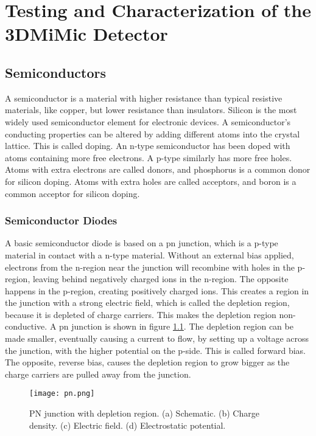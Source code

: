 \documentclass[../main/thesis.tex]{subfiles}
\begin{document}
\newpage
\chapter{Testing and Characterization of the 3DMiMic Detector}
\label{3dmimic}

\section{Semiconductors}
\label{t-semi}

A semiconductor is a material with higher resistance than typical resistive materials, like copper, but lower resistance than insulators. Silicon is the most widely used semiconductor element for electronic devices. A semiconductor's conducting properties can be altered by adding different atoms into the crystal lattice. This is called doping. An n-type semiconductor has been doped with atoms containing more free electrons. A p-type similarly has more free holes. Atoms with extra electrons are called donors, and phosphorus is a common donor for silicon doping. Atoms with extra holes are called acceptors, and boron is a common acceptor for silicon doping. 

\subsection{Semiconductor Diodes}

A basic semiconductor diode is based on a pn junction, which is a p-type material in contact with a n-type material. Without an external bias applied, electrons from the n-region near the junction will recombine with holes in the p-region, leaving behind negatively charged ions in the n-region. The opposite happens in the p-region, creating positively charged ions. This creates a region in the junction with a strong electric field, which is called the depletion region, because it is depleted of charge carriers. This makes the depletion region non-conductive. A pn junction is shown in figure \ref{fig-pn}. The depletion region can be made smaller, eventually causing a current to flow, by setting up a voltage across the junction, with the higher potential on the p-side. This is called forward bias. The opposite, reverse bias, causes the depletion region to grow bigger as the charge carriers are pulled away from the junction. 

\begin{figure}%
	\centering
	\texttt{[image: pn.png]}
	\caption{PN junction with depletion region. (a) Schematic. (b) Charge density. (c) Electric field. (d) Electrostatic potential. \citep{analogbok}}
	\label{fig-pn}
\end{figure}
\end{document}
